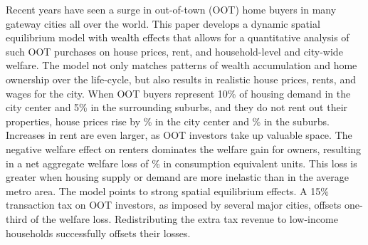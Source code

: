 \documentclass[letterpaper,12pt,dvipsnames,usenames]{article}
\theoremstyle{definition}
\begin{document}
\begin{spacing}{1.25}
{Recent years have seen a surge in out-of-town (OOT) home buyers in many gateway cities all over the world. This paper develops a dynamic spatial equilibrium model with wealth effects that allows for a quantitative analysis of such OOT purchases on house prices, rent, and household-level and city-wide welfare. The model not only matches patterns of wealth accumulation and home ownership over the life-cycle, but also results in realistic house prices, rents, and wages for the city.  When OOT buyers represent 10\% of housing demand in the city center and 5\% in the surrounding suburbs, and they do not rent out their properties, house prices rise by \% in the city center and \% in the suburbs. Increases in rent are even larger, as OOT investors take up valuable space. The negative welfare effect on renters dominates the welfare gain for owners, resulting in a net aggregate welfare loss of \% in consumption equivalent units. This loss is greater when housing supply or demand are more inelastic than in the average metro area. The model points to strong spatial equilibrium effects.  A 15\% transaction tax on OOT investors, as imposed by several major cities, offsets one-third of the welfare loss. Redistributing the extra tax revenue to low-income households successfully offsets their losses.

}
\end{spacing}

\bigskip
\end{document}
